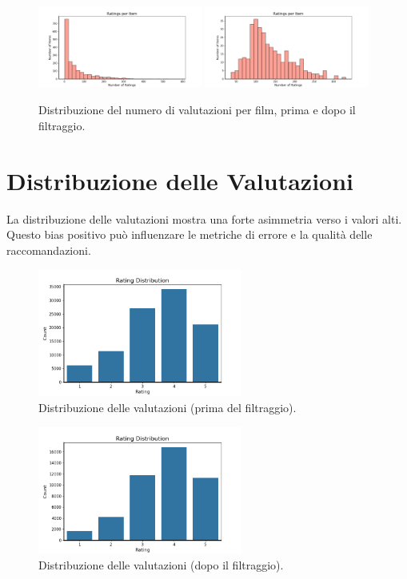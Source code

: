 \begin{figure}[H]
  \centering
  \includegraphics[width=0.48\textwidth]{../output/eda/before_cut/before_ratings_per_item_hist.png}
  \includegraphics[width=0.48\textwidth]{../output/eda/after_cut/after_ratings_per_item_hist.png}
  \caption{Distribuzione del numero di valutazioni per film, prima e dopo il filtraggio.}
\end{figure}

\section{Distribuzione delle Valutazioni}
La distribuzione delle valutazioni mostra una forte asimmetria verso i valori alti. Questo bias positivo può influenzare le metriche di errore e la qualità delle raccomandazioni.

\begin{figure}[H]
    \centering
    \includegraphics[width=0.6\textwidth]{../output/eda/before_cut/before_rating_distribution.png}
    \caption{Distribuzione delle valutazioni (prima del filtraggio).}
\end{figure}

\begin{figure}[H]
    \centering
    \includegraphics[width=0.6\textwidth]{../output/eda/after_cut/after_rating_distribution.png}
    \caption{Distribuzione delle valutazioni (dopo il filtraggio).}
\end{figure}

